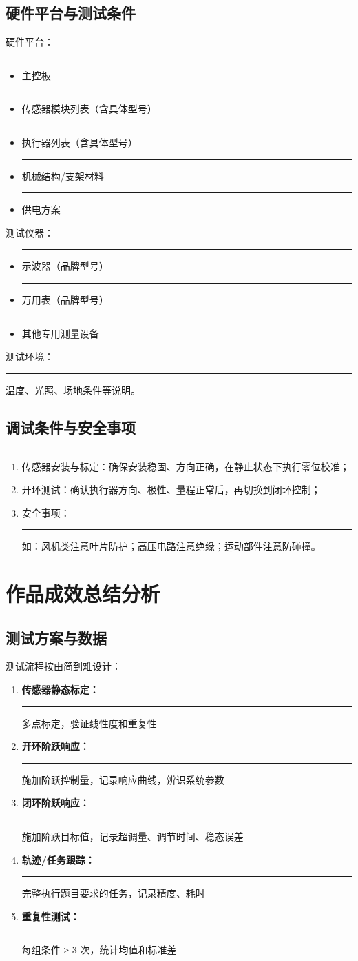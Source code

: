 \documentclass[12pt,a4paper,fontset=fandol]{ctexart}
\newcommand{\blank}{\rule{4cm}{0.4pt}}
\begin{document}
\subsection{硬件平台与测试条件}
硬件平台：
\begin{itemize}
  \item \blank{主控板}
  \item \blank{传感器模块列表}（含具体型号）
  \item \blank{执行器列表}（含具体型号）
  \item \blank{机械结构/支架材料}
  \item \blank{供电方案}
\end{itemize}
测试仪器：
\begin{itemize}
  \item \blank{示波器（品牌型号）}
  \item \blank{万用表（品牌型号）}
  \item \blank{其他专用测量设备}
\end{itemize}
测试环境：\blank{温度、光照、场地条件等说明}。

\subsection{调试条件与安全事项}
\begin{enumerate}
  \item \blank{传感器}安装与标定：确保安装稳固、方向正确，在静止状态下执行零位校准；
  \item 开环测试：确认执行器方向、极性、量程正常后，再切换到闭环控制；
  \item 安全事项：\blank{如：风机类注意叶片防护；高压电路注意绝缘；运动部件注意防碰撞}。
\end{enumerate}

\section{作品成效总结分析}

\subsection{测试方案与数据}
测试流程按由简到难设计：
\begin{enumerate}
  \item \textbf{传感器静态标定：}\blank{多点标定，验证线性度和重复性}
  \item \textbf{开环阶跃响应：}\blank{施加阶跃控制量，记录响应曲线，辨识系统参数}
  \item \textbf{闭环阶跃响应：}\blank{施加阶跃目标值，记录超调量、调节时间、稳态误差}
  \item \textbf{轨迹/任务跟踪：}\blank{完整执行题目要求的任务，记录精度、耗时}
  \item \textbf{重复性测试：}\blank{每组条件 ≥ 3 次，统计均值和标准差}
\end{enumerate}
\end{document}
